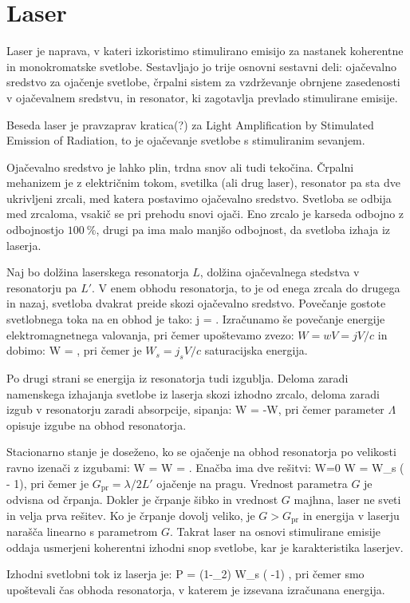 \section{Laser}
Laser je naprava, v kateri izkoristimo stimulirano emisijo za nastanek koherentne in monokromatske
svetlobe. Sestavljajo jo trije osnovni sestavni deli: ojačevalno sredstvo za ojačenje svetlobe, 
črpalni sistem za vzdrževanje obrnjene zasedenosti v ojačevalnem sredstvu, in resonator, ki zagotavlja
prevlado stimulirane emisije.

Beseda laser je pravzaprav kratica(?) za Light Amplification by Stimulated Emission of Radiation, 
to je ojačevanje svetlobe s stimuliranim sevanjem. 

Ojačevalno sredstvo je lahko plin, trdna snov ali tudi tekočina. Črpalni mehanizem je z električnim
tokom, svetilka (ali drug laser), resonator pa sta dve ukrivljeni zrcali, med katera postavimo
ojačevalno sredstvo. Svetloba se odbija med zrcaloma, vsakič se pri prehodu snovi ojači. Eno zrcalo
je karseda odbojno z odbojnostjo $100~\%$, drugi pa ima malo manjšo odbojnost, da svetloba izhaja
iz laserja. 

Naj bo dolžina laserskega resonatorja $L$, dolžina ojačevalnega stedstva v resonatorju pa $L'$. V enem 
obhodu resonatorja, to je od enega zrcala do drugega in nazaj, svetloba dvakrat preide skozi ojačevalno
sredstvo. Povečanje gostote svetlobnega toka na en obhod je tako:
\beq
\Delta j = .
\eeq
Izračunamo še povečanje energije elektromagnetnega valovanja, pri čemer upoštevamo zvezo:
$W = wV = jV/c$ in dobimo:
\beq
\Delta W = ,
\eeq
pri čemer je $W_s = j_s V/c$ saturacijska energija. 

Po drugi strani se energija iz resonatorja tudi izgublja. Deloma zaradi namenskega izhajanja
svetlobe iz laserja skozi izhodno zrcalo, deloma zaradi izgub v resonatorju zaradi absorpcije, sipanja:
\beq
\Delta W = -\Lambda W,
\eeq
pri čemer parameter $\Lambda$ opisuje izgube na obhod resonatorja.

Stacionarno stanje je doseženo, ko se ojačenje na obhod resonatorja po velikosti ravno izenači z izgubami:
\beq
\Delta W = \Lambda W = .
\eeq
Enačba ima dve rešitvi:
\beq
W=0 \qquad {} \qquad W = W_s \left( - 1\right),
\eeq
pri čemer je $G_\mathrm{pr} = \lambda/2L'$ ojačenje na pragu. Vrednost parametra $G$ 
je odvisna od črpanja. Dokler je črpanje šibko in vrednost $G$ majhna, laser ne sveti in velja prva rešitev. 
Ko je črpanje dovolj veliko, je $G>G_\mathrm{pr}$ in energija v laserju narašča linearno s parametrom $G$.
Takrat laser na osnovi stimulirane emisije oddaja usmerjeni koherentni izhodni snop svetlobe, kar
je karakteristika laserjev.

Izhodni svetlobni tok iz laserja je:
\beq
P = (1-_2) W_s \left( -1\right) ,
\eeq
pri čemer smo upoštevali čas obhoda resonatorja, v katerem je izsevana izračunana energija.
